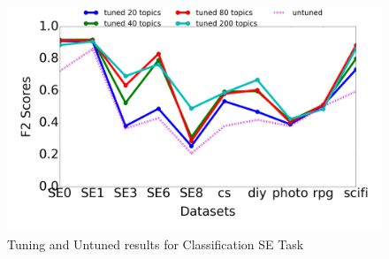 \documentclass[twocolumn,5p,sort&compress]{elsarticle}
\theoremstyle{break}
\begin{document}
\begin{figure}[!b]
  \begin{center}
    \includegraphics[width=\linewidth]{./fig/classification.png}
    \end{center}
  \caption{Tuning and Untuned results for Classification SE Task}\label{fig:class}  
\end{figure}
\end{document}

